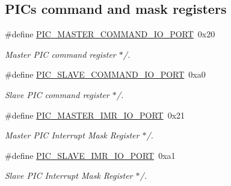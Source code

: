 \subsection*{P\+IC\textquotesingle{}s command and mask registers}
\begin{DoxyCompactItemize}
\item 
\mbox{\label{group__mips__i8259__irq_ga1a3ee301f9e0314a9657ab0fc71f73a5}} 
\#define \mbox{\hyperlink{group__mips__i8259__irq_ga1a3ee301f9e0314a9657ab0fc71f73a5}{P\+I\+C\+\_\+\+M\+A\+S\+T\+E\+R\+\_\+\+C\+O\+M\+M\+A\+N\+D\+\_\+\+I\+O\+\_\+\+P\+O\+RT}}~0x20
\begin{DoxyCompactList}\small\item\em Master P\+IC command register $\ast$/. \end{DoxyCompactList}\item 
\mbox{\label{group__mips__i8259__irq_gaa2344529019714e2ba78b74a18a20ff9}} 
\#define \mbox{\hyperlink{group__mips__i8259__irq_gaa2344529019714e2ba78b74a18a20ff9}{P\+I\+C\+\_\+\+S\+L\+A\+V\+E\+\_\+\+C\+O\+M\+M\+A\+N\+D\+\_\+\+I\+O\+\_\+\+P\+O\+RT}}~0xa0
\begin{DoxyCompactList}\small\item\em Slave P\+IC command register $\ast$/. \end{DoxyCompactList}\item 
\mbox{\label{group__mips__i8259__irq_gafb5e70ba8fa65622b32b205d3568d1f0}} 
\#define \mbox{\hyperlink{group__mips__i8259__irq_gafb5e70ba8fa65622b32b205d3568d1f0}{P\+I\+C\+\_\+\+M\+A\+S\+T\+E\+R\+\_\+\+I\+M\+R\+\_\+\+I\+O\+\_\+\+P\+O\+RT}}~0x21
\begin{DoxyCompactList}\small\item\em Master P\+IC Interrupt Mask Register $\ast$/. \end{DoxyCompactList}\item 
\mbox{\label{group__mips__i8259__irq_ga5bbabe22cf07171c58bb2887feba6301}} 
\#define \mbox{\hyperlink{group__mips__i8259__irq_ga5bbabe22cf07171c58bb2887feba6301}{P\+I\+C\+\_\+\+S\+L\+A\+V\+E\+\_\+\+I\+M\+R\+\_\+\+I\+O\+\_\+\+P\+O\+RT}}~0xa1
\begin{DoxyCompactList}\small\item\em Slave P\+IC Interrupt Mask Register $\ast$/. \end{DoxyCompactList}\end{DoxyCompactItemize}
